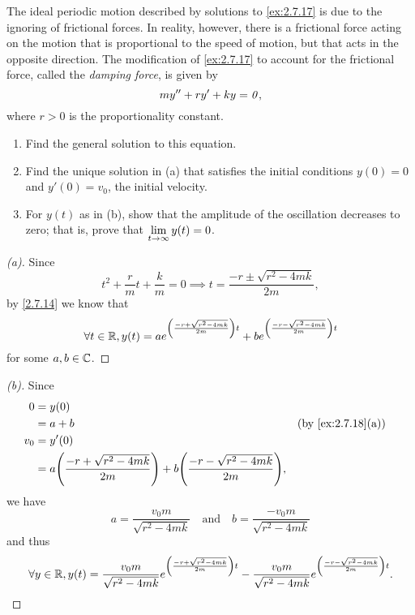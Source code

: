 \begin{ex}\label{ex:2.7.18}
  The ideal periodic motion described by solutions to \cref{ex:2.7.17} is due to the ignoring of frictional forces.
  In reality, however, there is a frictional force acting on the motion that is proportional to the speed of motion, but that acts in the opposite direction.
  The modification of \cref{ex:2.7.17} to account for the frictional force, called the \emph{damping force}, is given by
  \[
    m y'' + r y' + ky = \mathit{0},
  \]
  where \(r > 0\) is the proportionality constant.
  \begin{enumerate}
    \item Find the general solution to this equation.
    \item Find the unique solution in (a) that satisfies the initial conditions \(y(0) = 0\) and \(y'(0) = v_0\), the initial velocity.
    \item For \(y(t)\) as in (b), show that the amplitude of the oscillation decreases to zero;
          that is, prove that \(\lim\limits_{t \to \infty} y(t) = 0\).
  \end{enumerate}
\end{ex}

\begin{proof}[(a)]
  Since
  \[
    t^2 + \frac{r}{m} t + \frac{k}{m} = 0 \implies t = \frac{-r \pm \sqrt{r^2 - 4mk}}{2m},
  \]
  by \cref{2.7.14} we know that
  \[
    \forall t \in \mathbb{R}, y(t) = a e^{\left\lparen\frac{-r + \sqrt{r^2 - 4mk}}{2m}\right\rparen t} + b e^{\left\lparen\frac{-r - \sqrt{r^2 - 4mk}}{2m}\right\rparen t}
  \]
  for some \(a, b \in \mathbb{C}\).
\end{proof}

\begin{proof}[(b)]
  Since
  \begin{align*}
    0   & = y(0)                                                                                                      \\
        & = a + b                                                                              &  & \by{ex:2.7.18}[a] \\
    v_0 & = y'(0)                                                                                                     \\
        & = a \pa{\frac{-r + \sqrt{r^2 - 4mk}}{2m}} + b \pa{\frac{-r - \sqrt{r^2 - 4mk}}{2m}},
  \end{align*}
  we have
  \[
    a = \frac{v_0 m}{\sqrt{r^2 - 4mk}} \quad \text{and} \quad b = \frac{-v_0 m}{\sqrt{r^2 - 4mk}}
  \]
  and thus
  \[
    \forall y \in \mathbb{R}, y(t) = \frac{v_0 m}{\sqrt{r^2 - 4mk}} e^{\left\lparen\frac{-r + \sqrt{r^2 - 4mk}}{2m}\right\rparen t} - \frac{v_0 m}{\sqrt{r^2 - 4mk}} e^{\left\lparen\frac{-r - \sqrt{r^2 - 4mk}}{2m}\right\rparen t}.
  \]
\end{proof}

